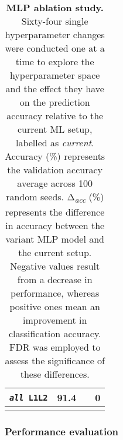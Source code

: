 {\begin{longtable}{|c|c|c|c|}
\texttt{\textit{all} L1L2}          & 91.4              &  \textminus2.5                   & 0            \\ \hline
\caption[MLP ablation study]{\textbf{MLP ablation study.} Sixty-four single hyperparameter changes were conducted one at a time to explore the hyperparameter space and the effect they have on the prediction accuracy relative to the current ML setup, labelled as \textit{current}. Accuracy (\%) represents the validation accuracy average across 100 random seeds. Δ\textsubscript{\textit{acc}} (\%) represents the difference in accuracy between the variant MLP model and the current setup. Negative values result from a decrease in performance, whereas positive ones mean an improvement in classification accuracy. FDR was employed to assess the significance of these differences.}
\label{tab:MLP_ablation}
\end{longtable}





\subsubsection{Performance evaluation}

}
